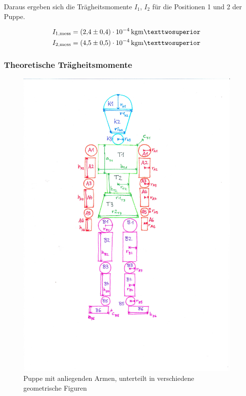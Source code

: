   Daraus ergeben sich die Trägheitsmomente $I_1$, $I_2$ für die Positionen 1 und 2 der Puppe.

  \begin{align*}
    I_\text{1,mess} &= \SI{2.4+-0.4 e-4}{\kilo\gram\meter²} \\
    I_\text{2,mess} &= \SI{4.5+-0.5 e-4}{\kilo\gram\meter²}
  \end{align*}

  \subsubsection{Theoretische Trägheitsmomente}

  \begin{figure}
    \centering
    \includegraphics[scale=0.8]{content/Igor.pdf}
    \caption{Puppe mit anliegenden Armen, unterteilt in verschiedene
    geometrische Figuren}
    \label{fig:Igor}
  \end{figure}

